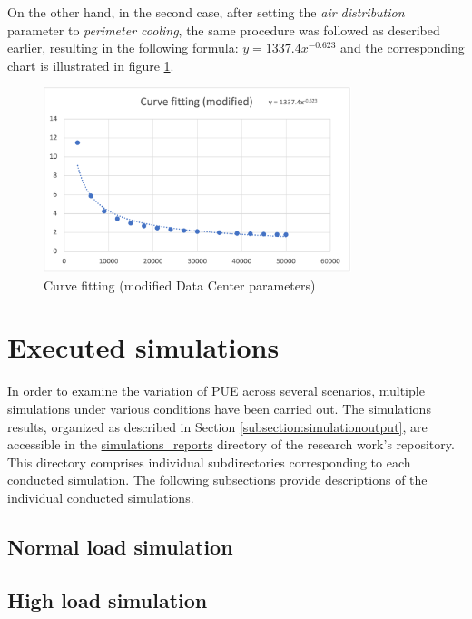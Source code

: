 On the other hand, in the second case, after setting the \emph{air distribution} parameter to \emph{perimeter cooling}, the same procedure was followed as described earlier, resulting in the following formula: \(y=1337.4x^{-0.623}\) and the corresponding chart is illustrated in figure \ref{fig:curve_fitting_modified}.
\begin{figure}[h]
    \centering
    \includegraphics[width=0.8\textwidth]{chapters/images/curve_fitting_modified.png}
    \caption{Curve fitting (modified Data Center parameters)}
    \label{fig:curve_fitting_modified}
\end{figure}

\section{Executed simulations}
In order to examine the variation of PUE across several scenarios, multiple simulations under various conditions have been carried out. The simulations results, organized as described in Section \ref{subsection:simulationoutput}, are accessible in the \href{https://github.com/vincenzo-emanuele/masters-degree-thesis/tree/main/simulation_reports}{simulations\_reports} directory of the research work's repository. This directory comprises individual subdirectories corresponding to each conducted simulation. The following subsections provide descriptions of the individual conducted simulations.

\subsection{Normal load simulation}

\subsection{High load simulation}

